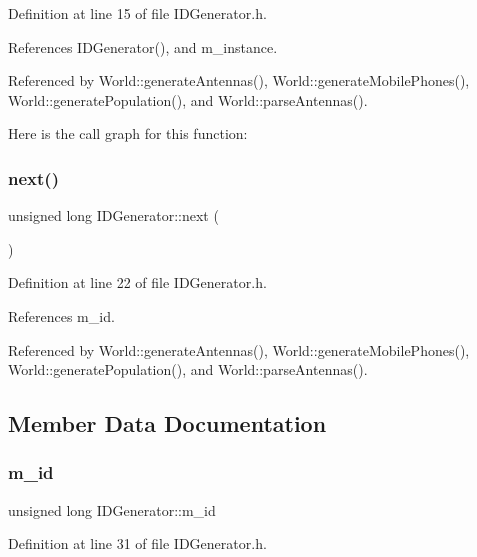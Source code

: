 Definition at line 15 of file I\+D\+Generator.\+h.



References I\+D\+Generator(), and m\+\_\+instance.



Referenced by World\+::generate\+Antennas(), World\+::generate\+Mobile\+Phones(), World\+::generate\+Population(), and World\+::parse\+Antennas().

Here is the call graph for this function\+:
\mbox{\label{class_i_d_generator_a99d8cabb2ec6a17888a8ccbe9c85fee0}} 
\subsubsection{next()}
{\footnotesize\ttfamily unsigned long I\+D\+Generator\+::next (\begin{DoxyParamCaption}{ }\end{DoxyParamCaption})\hspace{0.3cm}{\ttfamily [inline]}}



Definition at line 22 of file I\+D\+Generator.\+h.



References m\+\_\+id.



Referenced by World\+::generate\+Antennas(), World\+::generate\+Mobile\+Phones(), World\+::generate\+Population(), and World\+::parse\+Antennas().



\subsection{Member Data Documentation}
\mbox{\label{class_i_d_generator_ad0400380525f694b23ff675f4f170893}} 
\subsubsection{m\+\_\+id}
{\footnotesize\ttfamily unsigned long I\+D\+Generator\+::m\+\_\+id\hspace{0.3cm}{\ttfamily [private]}}



Definition at line 31 of file I\+D\+Generator.\+h.




